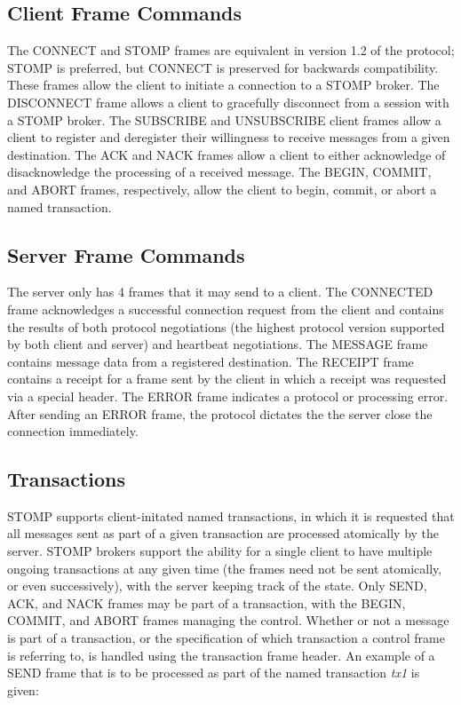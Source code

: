 \documentclass[conference, letterpaper]{IEEEtran}
\begin{document}
\subsection{Client Frame Commands}

The CONNECT and STOMP frames are equivalent in version 1.2 of the protocol; STOMP is preferred, but CONNECT is preserved for backwards compatibility. These frames allow the client to initiate a connection to a STOMP broker. The DISCONNECT frame allows a client to gracefully disconnect from a session with a STOMP broker. The SUBSCRIBE and UNSUBSCRIBE client frames allow a client to register and deregister their willingness to receive messages from a given destination. The ACK and NACK frames allow a client to either acknowledge of disacknowledge the processing of a received message. The BEGIN, COMMIT, and ABORT frames, respectively, allow the client to begin, commit, or abort a named transaction.

\subsection{Server Frame Commands}

The server only has 4 frames that it may send to a client. The CONNECTED frame acknowledges a successful connection request from the client and contains the results of both protocol negotiations (the highest protocol version supported by both client and server) and heartbeat negotiations. The MESSAGE frame contains message data from a registered destination. The RECEIPT frame contains a receipt for a frame sent by the client in which a receipt was requested via a special header. The ERROR frame indicates a protocol or processing error. After sending an ERROR frame, the protocol dictates the the server close the connection immediately.

\subsection{Transactions}
STOMP supports client-initated named transactions, in which it is requested that all messages sent as part of a given transaction are processed atomically by the server. STOMP brokers support the ability for a single client to have multiple ongoing transactions at any given time (the frames need not be sent atomically, or even successively), with the server keeping track of the state. Only SEND, ACK, and NACK frames may be part of a transaction, with the BEGIN, COMMIT, and ABORT frames managing the control. Whether or not a message is part of a transaction, or the specification of which transaction a control frame is referring to, is handled using the transaction frame header. An example of a SEND frame that is to be processed as part of the named transaction \textit{tx1} is given:
\end{document}

